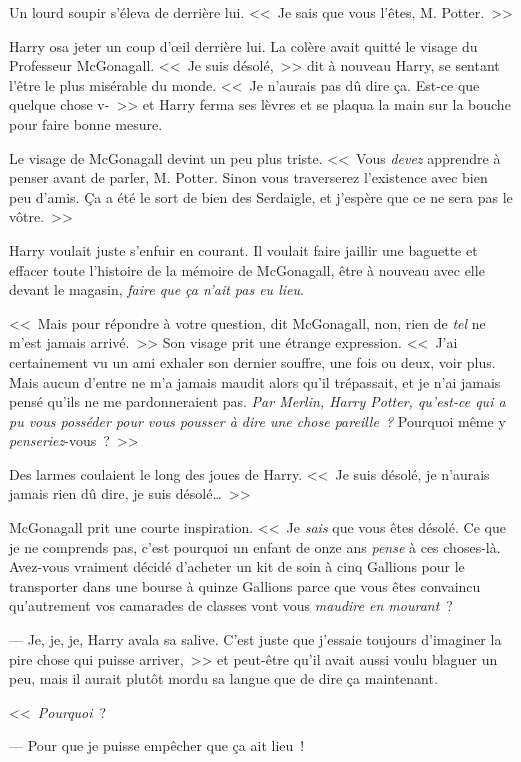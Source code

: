 Un lourd soupir s'éleva de derrière lui. <<~Je sais que vous l'êtes, M. Potter.~>>

Harry osa jeter un coup d'œil derrière lui. La colère avait quitté le visage du Professeur McGonagall. <<~Je suis désolé,~>> dit à nouveau Harry, se sentant l'être le plus misérable du monde. <<~Je n'aurais pas dû dire ça. Est-ce que quelque chose v-~>> et Harry ferma ses lèvres et se plaqua la main sur la bouche pour faire bonne mesure.

Le visage de McGonagall devint un peu plus triste. <<~Vous \emph{devez} apprendre à penser avant de parler, M. Potter. Sinon vous traverserez l'existence avec bien peu d'amis. Ça a été le sort de bien des Serdaigle, et j'espère que ce ne sera pas le vôtre.~>>

Harry voulait juste s'enfuir en courant. Il voulait faire jaillir une baguette et effacer toute l'histoire de la mémoire de McGonagall, être à nouveau avec elle devant le magasin, \emph{faire que ça n'ait pas eu lieu}.

<<~Mais pour répondre à votre question, dit McGonagall, non, rien de \emph{tel} ne m'est jamais arrivé.~>> Son visage prit une étrange expression. <<~J'ai certainement vu un ami exhaler son dernier souffre, une fois ou deux, voir plus. Mais aucun d'entre ne m'a jamais maudit alors qu'il trépassait, et je n'ai jamais pensé qu'ils ne me pardonneraient pas. \emph{Par Merlin, Harry Potter, qu'est-ce qui a pu vous posséder pour vous pousser à dire une chose pareille~?} Pourquoi même y \emph{penseriez}-vous~?~>>

Des larmes coulaient le long des joues de Harry. <<~Je suis désolé, je n'aurais jamais rien dû dire, je suis désolé…~>>

McGonagall prit une courte inspiration. <<~Je \emph{sais} que vous êtes désolé. Ce que je ne comprends pas, c'est pourquoi un enfant de onze ans \emph{pense} à ces choses-là. Avez-vous vraiment décidé d'acheter un kit de soin à cinq Gallions pour le transporter dans une bourse à quinze Gallions parce que vous êtes convaincu qu'autrement vos camarades de classes vont vous \emph{maudire en mourant}~?

--- Je, je,  je, Harry avala sa salive. C'est juste que j'essaie toujours d'imaginer la pire chose qui puisse arriver,~>> et peut-être qu'il avait aussi voulu blaguer un peu, mais il aurait plutôt mordu sa langue que de dire ça maintenant.

<<~\emph{Pourquoi}~?

--- Pour que je puisse empêcher que ça ait lieu~!

